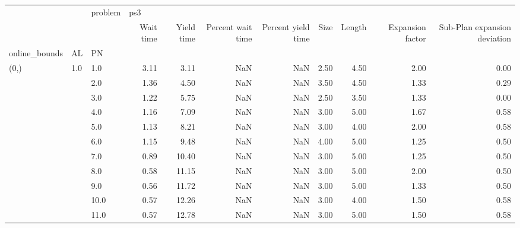\begin{tabular}{lllrrrrrrrr}
\toprule
     &     & problem & \multicolumn{8}{l}{ps3} \\
     &     & {} & Wait time & Yield time & Percent wait time & Percent yield time & Size & Length & Expansion factor & Sub-Plan expansion deviation \\
online\_bounds & AL & PN &           &            &                   &                    &      &        &                  &                              \\
\midrule
(0,) & 1.0 & 1.0  &      3.11 &       3.11 &               NaN &                NaN & 2.50 &   4.50 &             2.00 &                         0.00 \\
     &     & 2.0  &      1.36 &       4.50 &               NaN &                NaN & 3.50 &   4.50 &             1.33 &                         0.29 \\
     &     & 3.0  &      1.22 &       5.75 &               NaN &                NaN & 2.50 &   3.50 &             1.33 &                         0.00 \\
     &     & 4.0  &      1.16 &       7.09 &               NaN &                NaN & 3.00 &   5.00 &             1.67 &                         0.58 \\
     &     & 5.0  &      1.13 &       8.21 &               NaN &                NaN & 3.00 &   4.00 &             2.00 &                         0.58 \\
     &     & 6.0  &      1.15 &       9.48 &               NaN &                NaN & 4.00 &   5.00 &             1.25 &                         0.50 \\
     &     & 7.0  &      0.89 &      10.40 &               NaN &                NaN & 3.00 &   5.00 &             1.25 &                         0.50 \\
     &     & 8.0  &      0.58 &      11.15 &               NaN &                NaN & 3.00 &   5.00 &             2.00 &                         0.50 \\
     &     & 9.0  &      0.56 &      11.72 &               NaN &                NaN & 3.00 &   5.00 &             1.33 &                         0.50 \\
     &     & 10.0 &      0.57 &      12.26 &               NaN &                NaN & 3.00 &   4.00 &             1.50 &                         0.58 \\
     &     & 11.0 &      0.57 &      12.78 &               NaN &                NaN & 3.00 &   5.00 &             1.50 &                         0.58 \\

\end{tabular}
